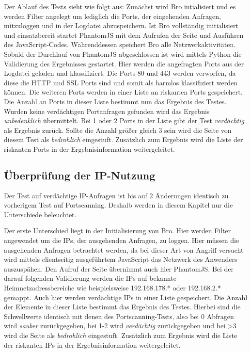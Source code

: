Der Ablauf des Tests sieht wie folgt aus: Zunächst wird Bro intialisiert und es werden Filter angelegt um lediglich die Ports, der eingehenden Anfragen, mitzuloggen und in der Logdatei abzuspeichern. Ist Bro vollständig initialisiert und einsatzbereit startet PhantomJS mit dem Aufrufen der Seite und Ausführen des JavaScript-Codes. Währenddessen speichert Bro alle Netzwerkaktivitäten. Sobald der Durchlauf von PhantomJS abgeschlossen ist wird mittels Python die Validierung des Ergebnisses gestartet. Hier werden die angefragten Ports aus der Logdatei geladen und klassifiziert. Die Ports 80 und 443 werden verworfen, da diese die HTTP und SSL Ports sind und somit als harmlos klassifiziert werden können. Die weiteren Ports werden in einer Liste an riskanten Ports gespeichert. Die Anzahl an Ports in dieser Liste bestimmt nun das Ergebnis des Testes. Wurden keine verdächtigen Portanfragen gefunden wird das Ergebnis \textit{unbedenklich} übermittelt. Bei 1 oder 2 Ports in der Liste gibt der Test \textit{verdächtig} als Ergebnis zurück. Sollte die Anzahl größer gleich 3 sein wird die Seite von diesem Test als \textit{bedrohlich} eingestuft. Zusätzlich zum Ergebnis wird die Liste der riskanten Ports in der Ergebnisinformation weitergeleitet.

\subsection{Überprüfung der IP-Nutzung}
Der Test auf verdächtige IP-Anfragen ist bis auf 2 Änderungen identisch zu vorherigem Test auf Portscanning. Deshalb werden in diesem Kapitel nur die Unterschiede beleuchtet.

Der erste Unterschied liegt in der Initialisierung von Bro. Hier werden Filter angewendet um die IPs, der ausgehenden Anfragen, zu loggen. Hier müssen die ausgehenden Anfragen betrachtet werden, da bei dieser Art von Angriff versucht wird mittels clientseitig ausgeführtem JavaScript das Netzwerk des Anwenders auszuspähen. Den Aufruf der Seite übernimmt auch hier PhantomJS. Bei der darauf folgenden Validierung werden die IPs auf bekannte Heimnetzadressbereiche wie beispielsweise 192.168.178.* oder 192.168.2.* gemappt. Auch hier werden verdächtige IPs in einer Liste gespeichert. Die Anzahl der Elemente in dieser Liste bestimmt das Ergebnis des Testes. Hierbei sind die Schwellwerte identisch mit denen des Portscanning-Tests, also bei 0 Abfragen wird \textit{sauber} zurückgegeben, bei 1-2 wird \textit{verdächtig} zurückgegeben und bei >3 wird die Seite als \textit{bedrohlich} eingestuft. Zusätzlich zum Ergebnis wird die Liste der riskanten IPs in der Ergebnisinformation weitergeleitet.

